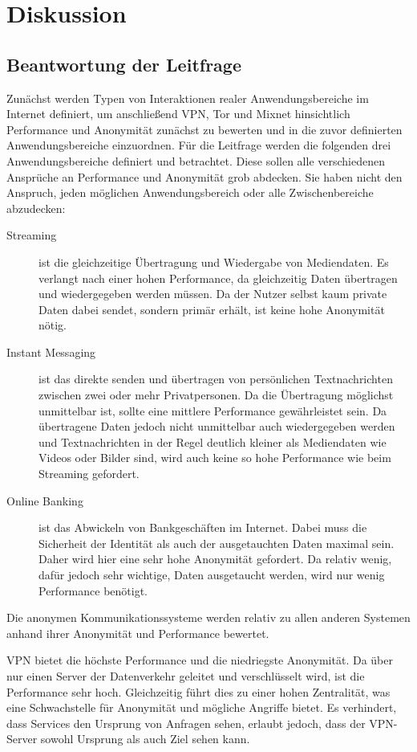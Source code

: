 \section{Diskussion}

\subsection{Beantwortung der Leitfrage}

Zunächst werden Typen von Interaktionen realer Anwendungsbereiche im Internet definiert, um anschließend VPN, Tor und Mixnet hinsichtlich Performance und Anonymität zunächst zu bewerten und in die zuvor definierten Anwendungsbereiche einzuordnen.
Für die Leitfrage werden die folgenden drei Anwendungsbereiche definiert und betrachtet. Diese sollen alle verschiedenen Ansprüche an Performance und Anonymität grob abdecken. Sie haben nicht den Anspruch, jeden möglichen Anwendungsbereich oder alle Zwischenbereiche abzudecken:

\begin{description}
    \item[Streaming] ist die gleichzeitige Übertragung und Wiedergabe von Mediendaten. Es verlangt nach einer hohen Performance, da gleichzeitig Daten übertragen und wiedergegeben werden müssen. Da der Nutzer selbst kaum private Daten dabei sendet, sondern primär erhält, ist keine hohe Anonymität nötig.
    \item[Instant Messaging] ist das direkte senden und übertragen von persönlichen Textnachrichten zwischen zwei oder mehr Privatpersonen. Da die Übertragung möglichst unmittelbar ist, sollte eine mittlere Performance gewährleistet sein. Da übertragene Daten jedoch nicht unmittelbar auch wiedergegeben werden und Textnachrichten in der Regel deutlich kleiner als Mediendaten wie Videos oder Bilder sind, wird auch keine so hohe Performance wie beim Streaming gefordert.
    \item[Online Banking] ist das Abwickeln von Bankgeschäften im Internet. Dabei muss die Sicherheit der Identität als auch der ausgetauchten Daten maximal sein. Daher wird hier eine sehr hohe Anonymität gefordert. Da relativ wenig, dafür jedoch sehr wichtige, Daten ausgetaucht werden, wird nur wenig Performance benötigt.
\end{description}

Die anonymen Kommunikationssysteme werden relativ zu allen anderen Systemen anhand ihrer Anonymität und Performance bewertet.

VPN bietet die höchste Performance und die niedriegste Anonymität. Da über nur einen Server der Datenverkehr geleitet und verschlüsselt wird, ist die Performance sehr hoch. Gleichzeitig führt dies zu einer hohen Zentralität, was eine Schwachstelle für Anonymität und mögliche Angriffe bietet. Es verhindert, dass Services den Ursprung von Anfragen sehen, erlaubt jedoch, dass der VPN-Server sowohl Ursprung als auch Ziel sehen kann.

